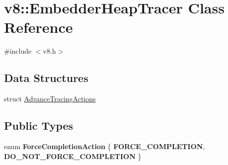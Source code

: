 \hypertarget{classv8_1_1EmbedderHeapTracer}{}\section{v8\+:\+:Embedder\+Heap\+Tracer Class Reference}
\label{classv8_1_1EmbedderHeapTracer}


{\ttfamily \#include $<$v8.\+h$>$}

\subsection*{Data Structures}
\begin{DoxyCompactItemize}
\item 
struct \mbox{\hyperlink{structv8_1_1EmbedderHeapTracer_1_1AdvanceTracingActions}{Advance\+Tracing\+Actions}}
\end{DoxyCompactItemize}
\subsection*{Public Types}
\begin{DoxyCompactItemize}
\item 
\mbox{\label{classv8_1_1EmbedderHeapTracer_a03f39acf619cc4b3de1061a514e4c27d}} 
enum {\bfseries Force\+Completion\+Action} \{ {\bfseries F\+O\+R\+C\+E\+\_\+\+C\+O\+M\+P\+L\+E\+T\+I\+ON}, 
{\bfseries D\+O\+\_\+\+N\+O\+T\+\_\+\+F\+O\+R\+C\+E\+\_\+\+C\+O\+M\+P\+L\+E\+T\+I\+ON}
 \}
\end{DoxyCompactItemize}
